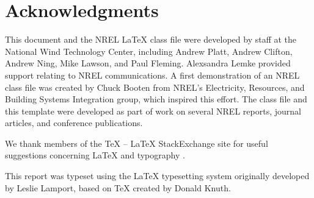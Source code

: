 \section*{Acknowledgments}
This document and the NREL LaTeX class file were developed by staff at the National Wind Technology Center, including Andrew Platt, Andrew Clifton, Andrew Ning, Mike Lawson, and Paul Fleming. Alexsandra Lemke provided support relating to NREL communications. A first demonstration of an NREL class file was created by Chuck Booten from NREL's Electricity, Resources, and Building Systems Integration group, which inspired this effort. The class file and this template were developed as part of work on several NREL reports, journal articles, and conference publications. 

We thank members of the TeX -- LaTeX StackExchange site for useful suggestions concerning LaTeX and typography \citep{texstackexchange}.

This report was typeset using the LaTeX typesetting system originally developed by Leslie Lamport, based on TeX created by Donald Knuth.